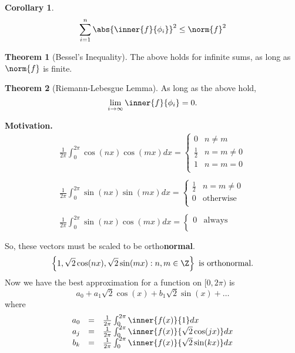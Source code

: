 \documentclass[a5paper]{article}
\theoremstyle{definition}%
\newtheorem*{theorem*}{Theorem} %
\newtheorem*{corollary*}{Corollary}
\numberwithin{exercise}{section}
\theoremstyle{remark}%
\begin{document}
\begin{corollary*}
$$\sum_{i=1}^n\abs{\inner{f}{\phi_i}}^2\leq\norm{f}^2$$
\end{corollary*}

\begin{theorem*}[Bessel's Inequality] The above holds for infinite sums, as long as $\norm{f}$ is finite. 
\end{theorem*}

\begin{theorem*}[Riemann-Lebesgue Lemma] As long as the above hold, 
$$\lim_{i\to\infty}\inner{f}{\phi_i}=0.$$
\end{theorem*}

\pagebreak
\textbf{Motivation.} 
\[\begin{array}{l}
\frac{1}{2\pi} \int_0^{2\pi} \cos(nx)\cos(mx)dx=
\begin{cases}
0				&n\neq m\\
\tfrac{1}{2}	&n=m\neq0\\
1				&n=m=0\\
\end{cases}
\\
\\
\frac{1}{2\pi} \int_0^{2\pi} \sin(nx)\sin(mx)dx=
\begin{cases}
\tfrac{1}{2}	&n=m\neq0\\
0				&\text{otherwise}\\
\end{cases}
\\
\\
\frac{1}{2\pi} \int_0^{2\pi} \sin(nx)\cos(mx)dx=
\begin{cases}
0				&\text{always}\\
\end{cases}
\\
\\
\end{array}\]
So, these vectors must be scaled to be ortho\textbf{normal}. 
$$\left\lbrace 1, \sqrt{2}\cos(nx), \sqrt{2}\sin(mx) : n,m\in\Z\right\rbrace \text{ is orthonormal.}$$
Now we have the best approximation for a function on $[0,2\pi)$ is 
$$a_0+a_1\sqrt{2}\cos(x)+b_1\sqrt{2}\sin(x)+\dots$$
where
\[\begin{array}{rcl}
a_0 &=& \frac{1}{2\pi}\int_{0}^{2\pi} \inner{f(x)}{1}dx\\
a_j &=& \frac{1}{2\pi}\int_{0}^{2\pi} \inner{f(x)}{\sqrt{2}\cos(jx)}dx\\
b_k &=& \frac{1}{2\pi}\int_{0}^{2\pi} \inner{f(x)}{\sqrt{2}\sin(kx)}dx\\
\end{array}\]
\end{document}
